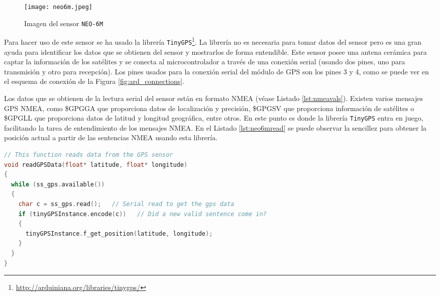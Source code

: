 \begin{wrapfigure}{r}{0.2\linewidth}
    \centering
    \texttt{[image: neo6m.jpeg]}
    \caption{Imagen del sensor \texttt{NEO-6M} \protect\footnotemark}
    \label{fig:myfig}
\end{wrapfigure}


Para hacer uso de este sensor se ha usado la librería \texttt{TinyGPS}\footnote{\url{http://arduiniana.org/libraries/tinygps/}}. La librería no es necesaria para tomar datos del sensor pero es una gran ayuda para identificar los datos que se obtienen del sensor y mostrarlos de forma entendible. Este sensor posee una antena cerámica para captar la información de los satélites y se conecta al microcontrolador a través de una conexión serial (usando dos pines, uno para transmisión y otro para recepción). Los pines usados para la conexión serial del módulo de \ac{GPS} son los pines 3 y 4, como se puede ver en el esquema de conexión de la Figura \ref{fig:ard_connections}.

Los datos que se obtienen de la lectura serial del sensor están en formato \ac{NMEA} (véase Listado \ref{lst:nmeavals}). Existen varios mensajes \ac{GPS} \ac{NMEA}, como \$GPGGA que proporciona datos de localización y precisión, \$GPGSV que proporciona información de satélites o \$GPGLL que proporciona datos de latitud y longitud geográfica, entre otros. En este punto es donde la librería \texttt{TinyGPS} entra en juego, facilitando la tarea de entendimiento de los mensajes \ac{NMEA}. En el Listado \ref{lst:neo6mread} se puede observar la sencillez para obtener la posición actual a partir de las sentencias \ac{NMEA} usando esta librería.

\begin{lstlisting}[language=c++,captionpos=t,caption={\textbf{Lectura de datos del módulo GPS usando una comunicación serial.}},label={lst:neo6mread}]
// This function reads data from the GPS sensor
void readGPSData(float* latitude, float* longitude)
{
  while (ss_gps.available())
  {
    char c = ss_gps.read();   // Serial read to get the gps data
    if (tinyGPSInstance.encode(c))   // Did a new valid sentence come in?
    {
      tinyGPSInstance.f_get_position(latitude, longitude);
    }
  }
}
\end{lstlisting}

